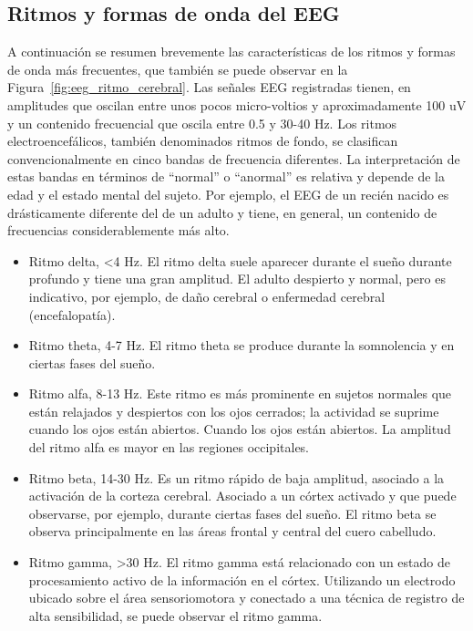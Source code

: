 \subsection{Ritmos y formas de onda del EEG}
A continuación se resumen brevemente las características de los ritmos y formas de onda más frecuentes, que también se puede observar en la Figura~\ref{fig:eeg_ritmo_cerebral}. 
Las señales EEG registradas tienen, en amplitudes que oscilan entre unos pocos micro-voltios y aproximadamente 100 uV y un contenido frecuencial que oscila entre 0.5 y 30-40 Hz. Los ritmos electroencefálicos, también denominados ritmos de fondo, se clasifican convencionalmente en cinco bandas de frecuencia diferentes. La interpretación de estas bandas en términos de ``normal'' o ``anormal'' es relativa y depende de la edad y el estado mental del sujeto. Por ejemplo, el EEG de un recién nacido es drásticamente diferente del de un adulto y tiene, en general, un contenido de frecuencias considerablemente más alto.
\begin{itemize}
    \item Ritmo delta, <4 Hz. El ritmo delta suele aparecer durante el sueño durante profundo y tiene una gran amplitud. El adulto despierto y normal, pero es indicativo, por ejemplo, de daño cerebral o enfermedad cerebral (encefalopatía).
    \item Ritmo theta, 4-7 Hz. El ritmo theta se produce durante la somnolencia y en ciertas fases del sueño.
    \item Ritmo alfa, 8-13 Hz. Este ritmo es más prominente en sujetos normales que están relajados y despiertos con los ojos cerrados; la actividad se suprime cuando los ojos están abiertos. Cuando los ojos están abiertos. La amplitud del ritmo alfa es mayor en las regiones occipitales.
    \item Ritmo beta, 14-30 Hz. Es un ritmo rápido de baja amplitud, asociado a la activación de la corteza cerebral. Asociado a un córtex activado y que puede observarse, por ejemplo, durante ciertas fases del sueño. El ritmo beta se observa principalmente en las áreas frontal y central del cuero cabelludo.
    \item Ritmo gamma, >30 Hz. El ritmo gamma está relacionado con un estado de procesamiento activo de la información en el córtex. Utilizando un electrodo ubicado sobre el área sensoriomotora y conectado a una técnica de registro de alta sensibilidad, se puede observar el ritmo gamma.
\end{itemize}

